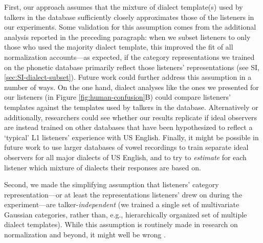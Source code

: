 \documentclass[preprint]{JASA}
\begin{document}
First, our approach assumes that the mixture of dialect template(s) used by talkers in the database sufficiently closely approximates those of the listeners in our experiments. Some validation for this assumption comes from the additional analysis reported in the preceding paragraph: when we subset listeners to only those who used the majority dialect template, this improved the fit of all normalization accounts---as expected, if the category representations we trained on the phonetic database primarily reflect those listeners' representations (see SI, \ref{sec:SI-dialect-subset}). Future work could further address this assumption in a number of ways. On the one hand, dialect analyses like the ones we presented for our listeners (in Figure \ref{fig:human-confusion}B) could compare listeners' templates against the templates used by talkers in the database. Alternatively or additionally, researchers could see whether our results replicate if ideal observers are instead trained on other databases that have been hypothesized to reflect a `typical' L1 listeners' experience with US English. Finally, it might be possible in future work to use larger databases of vowel recordings to train separate ideal observers for all major dialects of US English, and to try to \emph{estimate} for each listener which mixture of dialects their responses are based on.

Second, we made the simplifying assumption that listeners' category representation---or at least the representations listeners' drew on during the experiment---are talker-\emph{independent} (we trained a single set of multivariate Gaussian categories, rather than, e.g., hierarchically organized set of multiple dialect templates). While this assumption is routinely made in research on normalization and beyond, it might well be wrong \citep[see e.g.,][]{xie2021}.
\end{document}
